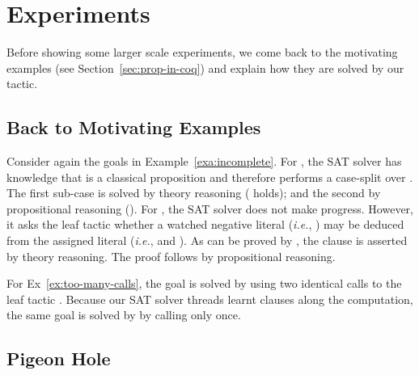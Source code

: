 \documentclass[utf8,a4paper,UKenglish,cleveref, autoref, thm-restate]{lipics-v2019}
\begin{document}
\section{Experiments}
\label{sec:experiments}

Before showing some larger scale experiments, we come back to the
motivating examples (see Section~\ref{sec:prop-in-coq}) and explain how
they are solved by our tactic.

\subsection{Back to Motivating Examples}

Consider again the goals in Example~\ref{exa:incomplete}.  For
, the SAT solver has knowledge that  is a classical
proposition and therefore performs a case-split over .
The first sub-case is solved by theory reasoning (
holds); and the second by propositional reasoning ().
%
For , the SAT solver does not make progress. However, it
asks the leaf tactic  whether a watched negative
literal (\emph{i.e.}, ) may be deduced from the assigned
literal (\emph{i.e.},  and ).
%
As  can be proved by ,
the clause is asserted by theory reasoning. The proof follows by
propositional reasoning.

For Ex~\ref{ex:too-many-calls}, the goal is solved by
 using two identical calls to the leaf tactic
.
%
Because our SAT solver threads learnt clauses along the computation,
the same goal is solved by  by calling
 only once.

\subsection{Pigeon Hole}
\end{document}
